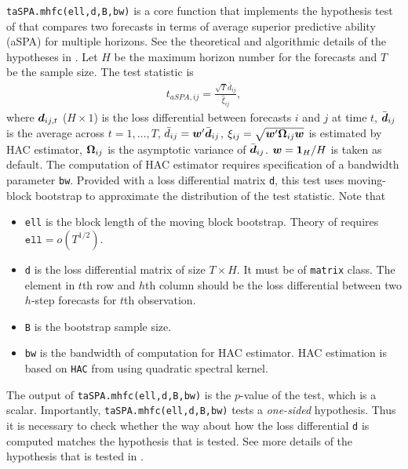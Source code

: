 \documentclass[12pt]{article}
\begin{document}
\texttt{taSPA.mhfc(ell,d,B,bw)} is a core function that implements the hypothesis test of  that compares two  forecasts  in terms of average superior predictive ability (aSPA) for multiple horizons. See the theoretical and algorithmic details of the hypotheses in . Let $H$ be the maximum horizon number for the forecasts and $T$ be the sample size. The test statistic is
\begin{align*}
	t_{aSPA, ij} = \frac{\sqrt{T}\bar{d}_{ij}}{\hat{\xi}_{ij}}, 
\end{align*}
where $\boldsymbol{d}_{ij, t}$ ($H\times 1$) is the loss differential between forecasts $i$ and $j$ at time $t$, $\bar{\boldsymbol{d}}_{ij}$ is the average across $t = 1, \ldots, T$, $\bar{d}_{ij}=\boldsymbol{w}'\bar{\boldsymbol{d}}_{ij}$,  $\xi_{ij}= \sqrt{\boldsymbol{w}'\boldsymbol{\Omega}_{ij}\boldsymbol{w}}$ is estimated by HAC estimator, $\boldsymbol{\Omega}_{ij}$ is the asymptotic variance of $\bar{\boldsymbol{d}}_{ij}$. $\boldsymbol{w}=\boldsymbol{1}_H/H$ is taken as default. The computation of HAC estimator requires specification of a bandwidth parameter \texttt{bw}. Provided with a loss differential matrix \texttt{d}, this test uses moving-block bootstrap to approximate the distribution of the test statistic. Note that
\begin{itemize}
	\item \texttt{ell} is the block length of the moving block bootstrap. Theory of  requires $\texttt{ell} = o(T^{1/2})$.
	\item \texttt{d} is the loss differential matrix of size $T \times H$. It must be of \texttt{matrix} class. The element in $t$th row and $h$th column should be the loss differential between two $h$-step forecasts for $t$th observation.
	\item \texttt{B} is the bootstrap sample size.
	\item \texttt{bw} is the bandwidth of computation for HAC estimator. HAC estimation is based on \texttt{HAC} from  using quadratic spectral kernel.
\end{itemize}

The output of \texttt{taSPA.mhfc(ell,d,B,bw)}  is the $p$-value of the test, which is a scalar.
 Importantly, \texttt{taSPA.mhfc(ell,d,B,bw)} tests a \emph{one-sided} hypothesis. Thus it is necessary to check whether the way about how the loss differential \texttt{d} is computed matches the hypothesis that is tested. See more details of the hypothesis that is tested in .
 
\end{document}
